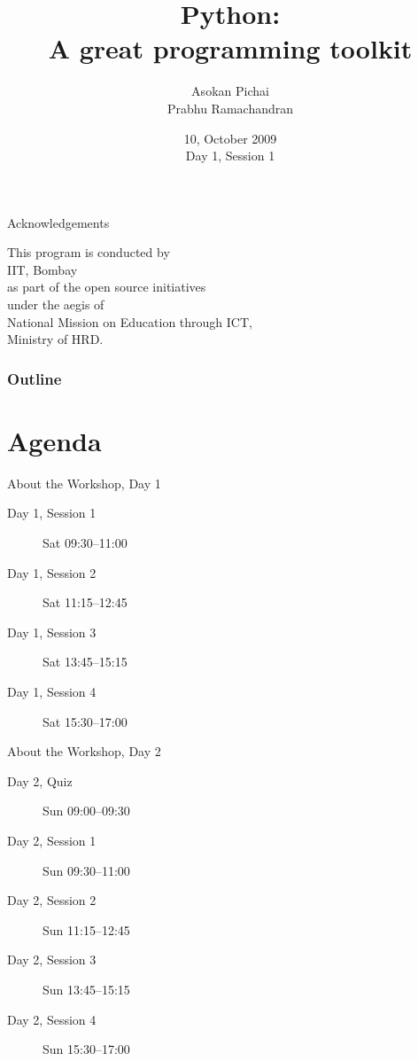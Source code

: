 \documentclass[14pt,compress]{beamer}
\title[Basic Python]{Python:\\A great programming toolkit}
\author[FOSSEE Team] {Asokan Pichai\\Prabhu Ramachandran}
\institute[IIT Bombay] {Department of Aerospace Engineering\\IIT Bombay}
\date[] {10, October 2009\\Day 1, Session 1}
\begin{document}
\begin{frame}
  \titlepage
\end{frame}
\begin{frame}
  {Acknowledgements}
  \begin{center}
  This program is conducted by\\
  IIT, Bombay\\
  as part of  the open source initiatives\\
  under the aegis of\\
  \alert{National Mission on Education through ICT,} \\
  Ministry of HRD.
  \end{center}
\end{frame}

\begin{frame}
  \frametitle{Outline}
  \tableofcontents
\end{frame}

%

\section{Agenda}
\begin{frame}{About the Workshop, Day 1}
  \begin{description}
	\item[Day 1, Session 1] Sat 09:30--11:00
	\item[Day 1, Session 2] Sat 11:15--12:45
	\item[Day 1, Session 3] Sat 13:45--15:15
	\item[Day 1, Session 4] Sat 15:30--17:00
  \end{description}
\end{frame}
\begin{frame}{About the Workshop, Day 2}
  \begin{description}
        \item[Day 2, Quiz] Sun 09:00--09:30
        \item[Day 2, Session 1] Sun 09:30--11:00
	\item[Day 2, Session 2] Sun 11:15--12:45
	\item[Day 2, Session 3] Sun 13:45--15:15
	\item[Day 2, Session 4] Sun 15:30--17:00
  \end{description}
\end{frame}
\end{document}
